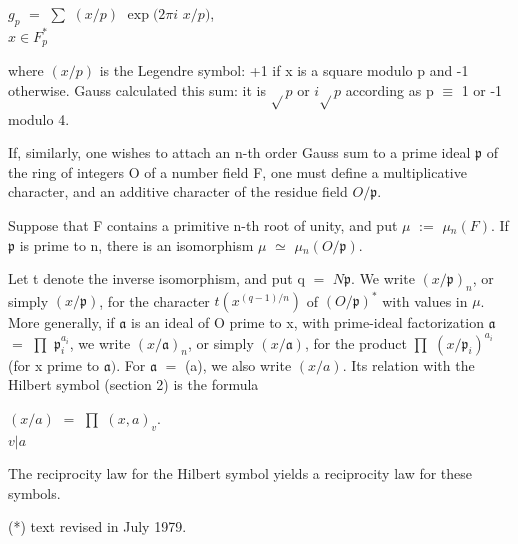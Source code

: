 \documentclass[10pt,a4paper]{article}
\begin{document}
\par\smallskip\begin{center}\begin{minipage}{0.96\textwidth}\centering
$g_p$ $=$ $\sum{}$ $(x/p)$ $\exp(2\pi{}i$ $x/p)$, \\ $x\in{}F_p^*$
\end{minipage}\end{center}\smallskip
\par where $(x/p)$ is the Legendre symbol: +1 if x is a square modulo p and -1 otherwise. Gauss calculated this sum: it is $\sqrt{}p$ or $i\sqrt{}p$ according as p $\equiv{}$ 1 or -1 modulo 4.\par
\par If, similarly, one wishes to attach an n-th order Gauss sum to a prime ideal $\mathfrak{p}$ of the ring of integers O of a number field F, one must define a multiplicative character, and an additive character of the residue field $O/\mathfrak{p}$.\par
\par Suppose that F contains a primitive n-th root of unity, and put $\mu{}$ $:=$ $\mu{}_n(F)$. If $\mathfrak{p}$ is prime to n, there is an isomorphism $\mu{}$ $\simeq{}$ $\mu{}_n(O/\mathfrak{p})$.\par
\par Let t denote the inverse isomorphism, and put q $=$ $N\mathfrak{p}$. We write $(x/\mathfrak{p})_n$, or simply $(x/\mathfrak{p})$, for the character $t(x^{(q-1)/n})$ of $(O/\mathfrak{p})^*$ with values in $\mu{}$. More generally, if $\mathfrak{a}$ is an ideal of O prime to x, with prime-ideal factorization $\mathfrak{a}$ $=$ $\prod{}$ $\mathfrak{p}_i^{a_i}$, we write $(x/\mathfrak{a})_n$, or simply $(x/\mathfrak{a})$, for the product $\prod{}$ $(x/\mathfrak{p}_i)^{a_i}$ (for x prime to $\mathfrak{a})$. For $\mathfrak{a}$ $=$ (a), we also write $(x/a)$. Its relation with the Hilbert symbol (section 2) is the formula\par
\par\smallskip\begin{center}\begin{minipage}{0.96\textwidth}\centering
$(x/a)$ $=$ $\prod{}$ $(x,a)_v$. \\ $v|a$
\end{minipage}\end{center}\smallskip
\par The reciprocity law for the Hilbert symbol yields a reciprocity law for these symbols.\par
\par (*) text revised in July 1979.\par
\end{document}
